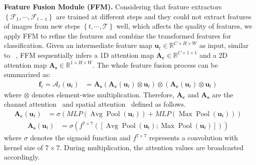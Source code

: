 \documentclass[letterpaper]{article} %
\begin{document}
\noindent\textbf{Feature Fusion Module (FFM).}\label{FFM}
Considering that feature extractors $\left\{\mathcal{F}_{1}, \cdots, \mathcal{F}_{t-1}\right\}$ are trained at different steps and they could not extract features of images from new steps $\left\{t, \cdots, \mathcal{T}\right\}$ well, which affects the quality of features, we apply FFM to refine the features and combine the transformed features for classification. Given an intermediate feature map $\boldsymbol{u}_{t} \in \mathbb{R}^{C \times H \times W}$ as input, similar to ~\cite{c0}, FFM sequentially infers a 1D attention map $\mathbf{A}_{\mathbf{c}} \in \mathbb{R}^{C \times 1 \times 1}$ and a 2D attention map $\mathbf{A}_{\mathbf{s}} \in \mathbb{R}^{1 \times H \times W}$. The whole feature fusion process can be summarized as:
\begin{equation}
\begin{aligned}
\boldsymbol{f}_{t}=\mathcal{A}_t(\boldsymbol{u}_{t}) &=\mathbf{A}_{\mathbf{s}}\left(\mathbf{A}_{\mathbf{c}}(\boldsymbol{u}_{t}) \otimes \boldsymbol{u}_{t}\right) \otimes \left(\mathbf{A}_{\mathbf{c}}(\boldsymbol{u}_{t}) \otimes \boldsymbol{u}_{t}\right)
\end{aligned} \label{e12}
\end{equation}
where $\otimes$ denotes element-wise multiplication. Therefore, $\mathbf{A}_{\mathbf{c}}$ and $\mathbf{A}_{\mathbf{s}}$ are the channel attention~\cite{c28, c0, e10} and spatial attention~\cite{c0, e11} defined as follows.
\begin{equation}
\begin{aligned}
\mathbf{A}_{\mathbf{c}}(\boldsymbol{u}_{t}) &=\sigma(M L P(\operatorname{Avg} \operatorname{Pool}(\boldsymbol{u}_{t}))+M L P(\operatorname{Max} \operatorname{Pool}(\boldsymbol{u}_{t})))
\end{aligned} \label{e13}
\end{equation}
\begin{equation}
\begin{aligned}
\mathbf{A}_{\mathbf{s}}(\boldsymbol{u}_{t}) &=\sigma\left(f^{7 \times 7}([\operatorname{Avg} \operatorname{Pool}(\boldsymbol{u}_{t}) ; \operatorname{Max} \operatorname{Pool}(\boldsymbol{u}_{t})])\right) 
\end{aligned} \label{e14}
\end{equation}
where $\sigma$ denotes the sigmoid function and $f^{7 \times 7}$ represents a convolution with kernel size of $7 \times 7$. During multiplication, the attention values are broadcasted accordingly.
\end{document}
